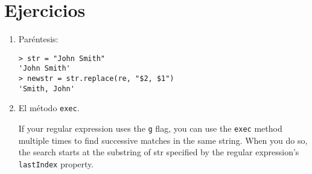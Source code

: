 \section{Ejercicios}
\label{section:ejercicioslastindex}
\begin{enumerate}
\item  Paréntesis:
\begin{verbatim}
> str = "John Smith"
'John Smith'
> newstr = str.replace(re, "$2, $1")
'Smith, John'
\end{verbatim}
\item  El método \verb|exec|.

If your regular expression uses the \verb"g" flag, you can use the \verb|exec|
method multiple times to find successive matches in the same string.
When you do so, the search starts at the substring of str specified
by the regular expression's \verb|lastIndex| property.


\end{enumerate}
